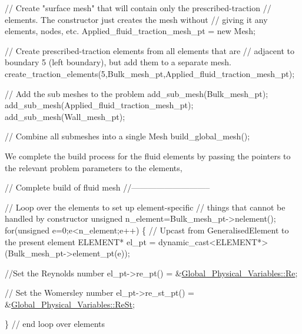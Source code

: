 \begin{DoxyCodeInclude}
 \textcolor{comment}{// Create "surface mesh" that will contain only the prescribed-traction }
 \textcolor{comment}{// elements. The constructor just creates the mesh without}
 \textcolor{comment}{// giving it any elements, nodes, etc.}
 Applied\_fluid\_traction\_mesh\_pt = \textcolor{keyword}{new} Mesh;
 
 \textcolor{comment}{// Create prescribed-traction elements from all elements that are }
 \textcolor{comment}{// adjacent to boundary 5 (left boundary), but add them to a separate mesh.}
 create\_traction\_elements(5,Bulk\_mesh\_pt,Applied\_fluid\_traction\_mesh\_pt);
 
 \textcolor{comment}{// Add the sub meshes to the problem}
 add\_sub\_mesh(Bulk\_mesh\_pt);
 add\_sub\_mesh(Applied\_fluid\_traction\_mesh\_pt);
 add\_sub\_mesh(Wall\_mesh\_pt);

 \textcolor{comment}{// Combine all submeshes into a single Mesh}
 build\_global\_mesh();

\end{DoxyCodeInclude}


We complete the build process for the fluid elements by passing the pointers to the relevant problem parameters to the elements,


\begin{DoxyCodeInclude}
   

 \textcolor{comment}{// Complete build of fluid mesh}
 \textcolor{comment}{//----------------------------- }
 
 \textcolor{comment}{// Loop over the elements to set up element-specific }
 \textcolor{comment}{// things that cannot be handled by constructor}
 \textcolor{keywordtype}{unsigned} n\_element=Bulk\_mesh\_pt->nelement();
 \textcolor{keywordflow}{for}(\textcolor{keywordtype}{unsigned} e=0;e<n\_element;e++)
  \{
   \textcolor{comment}{// Upcast from GeneralisedElement to the present element}
   ELEMENT* el\_pt = \textcolor{keyword}{dynamic\_cast<}ELEMENT*\textcolor{keyword}{>}(Bulk\_mesh\_pt->element\_pt(e));
   
   \textcolor{comment}{//Set the Reynolds number}
   el\_pt->re\_pt() = &\hyperlink{namespaceGlobal__Physical__Variables_ab814e627d2eb5bc50318879d19ab16b9}{Global\_Physical\_Variables::Re};

   \textcolor{comment}{// Set the Womersley number}
   el\_pt->re\_st\_pt() = &\hyperlink{namespaceGlobal__Physical__Variables_a085ee4bf968ffdd01a41b8c41864f907}{Global\_Physical\_Variables::ReSt};
   
  \} \textcolor{comment}{// end loop over elements}

\end{DoxyCodeInclude}


